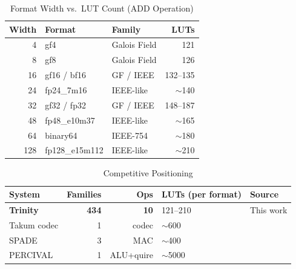 \begin{table}[htbp]
\centering
\caption{Format Width vs.\ LUT Count (ADD Operation)}
\label{tab:width-lut}
\begin{tabular}{rllr}
\toprule
Width & Format & Family & LUTs \\
\midrule
4  & gf4           & Galois Field & 121 \\
8  & gf8           & Galois Field & 126 \\
16 & gf16 / bf16   & GF / IEEE    & 132--135 \\
24 & fp24\_7m16    & IEEE-like   & $\sim$140 \\
32 & gf32 / fp32   & GF / IEEE    & 148--187 \\
48 & fp48\_e10m37  & IEEE-like   & $\sim$165 \\
64 & binary64      & IEEE-754    & $\sim$180 \\
128 & fp128\_e15m112 & IEEE-like  & $\sim$210 \\
\bottomrule
\end{tabular}
\end{table}

\begin{table}[htbp]
\centering
\caption{Competitive Positioning}
\label{tab:competitive}
\begin{tabular}{lrrll}
\toprule
System & Families & Ops & LUTs (per format) & Source \\
\midrule
\textbf{Trinity}    & \textbf{434} & \textbf{10} & 121--210 & This work \\
Takum codec         & 1  & codec & $\sim$600 & \cite{takum2024} \\
SPADE               & 3  & MAC   & $\sim$400 & \cite{spade2026} \\
PERCIVAL            & 1  & ALU+quire & $\sim$5000 & \cite{percival2022} \\
\bottomrule
\end{tabular}
\end{table}

